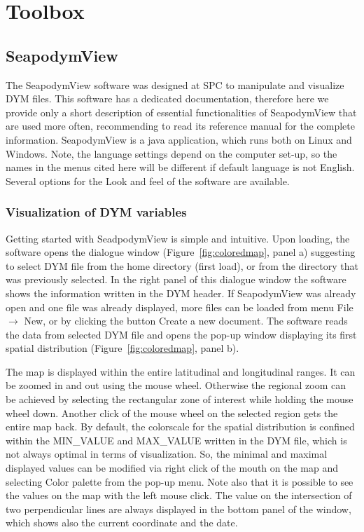 \chapter{Toolbox}\label{annex:toolbox}

\section{SeapodymView}\label{appendix-toolbox}
The SeapodymView software was designed at SPC to manipulate and visualize DYM files. This software has a dedicated documentation, therefore here we provide only a short description of essential functionalities of SeapodymView that are used more often, recommending to read its reference manual for the complete information. SeapodymView is a java application, which runs both on Linux and Windows. Note, the language settings depend on the computer set-up, so the names in the menus cited here will be different if default language is not English. Several options for the {\ttfamily Look and feel} of the software are available. \\


\subsection{Visualization of DYM variables}

Getting started with SeadpodymView is simple and intuitive. Upon loading, the software opens the dialogue window (Figure~\ref{fig:coloredmap}, panel a) suggesting to select DYM file from the home directory (first load), or from the directory that was previously selected. In the right panel of this dialogue window the software shows the information written in the DYM header. If SeapodymView was already open and one file was already displayed, more files can be loaded from menu {\ttfamily File $\rightarrow$ New}, or by clicking the button {\ttfamily Create a new document}. The software reads the data from selected DYM file and opens the pop-up window displaying its first spatial distribution (Figure~\ref{fig:coloredmap}, panel b).

The map is displayed within the entire latitudinal and longitudinal ranges. It can be zoomed in and out using the mouse wheel. Otherwise the regional zoom can be achieved by selecting the rectangular zone of interest while holding the mouse wheel down. Another click of the mouse wheel on the selected region gets the entire map back. By default, the colorscale for the spatial distribution is confined within the {\ttfamily MIN\_VALUE} and {\ttfamily MAX\_VALUE} written in the DYM file, which is not always optimal in terms of visualization. So, the minimal and maximal displayed values can be modified via right click of the mouth  on the map and selecting {\ttfamily Color palette} from the pop-up menu. Note also that it is possible to see the values on the map with the left mouse click. The value on the intersection of two perpendicular lines are always displayed in the bottom panel of the window, which shows also the current coordinate and the date.


